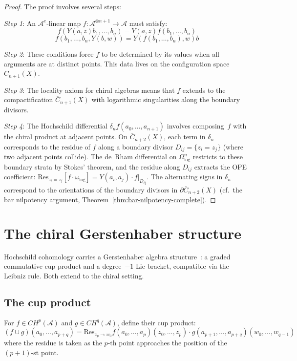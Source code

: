 \begin{proof}
The proof involves several steps:

\emph{Step 1}: An $\mathcal{A}^e$-linear map $f: \mathcal{A}^{\otimes n+1} \to \mathcal{A}$ must satisfy:
\[
f(Y(a, z)b_1, \ldots, b_n) = Y(a, z)f(b_1, \ldots, b_n)
\]
\[
f(b_1, \ldots, b_n, Y(b, w)) = Y(f(b_1, \ldots, b_n), w)b
\]

\emph{Step 2}: These conditions force $f$ to be determined by its values when all arguments are at distinct points. This data lives on the configuration space $C_{n+1}(X)$.

\emph{Step 3}: The locality axiom for chiral algebras means that $f$ extends to the compactification $\overline{C}_{n+1}(X)$ with logarithmic singularities along the boundary divisors.

\emph{Step 4}: The Hochschild differential
$\delta_n f(a_0, \ldots, a_{n+1})$ involves composing~$f$ with the
chiral product at adjacent points.  On $\overline{C}_{n+2}(X)$, each
term in $\delta_n$ corresponds to the residue of $f$ along a boundary
divisor $D_{ij} = \{z_i = z_j\}$ (where two adjacent points collide).
The de~Rham differential on $\Omega^n_{\log}$ restricts to these
boundary strata by Stokes' theorem, and the residue along
$D_{ij}$ extracts the OPE coefficient: $\mathrm{Res}_{z_i = z_j}
[f \cdot \omega_{\log}] = Y(a_i, a_j) \cdot f|_{D_{ij}}$.
The alternating signs in $\delta_n$ correspond to the orientations
of the boundary divisors in $\partial\overline{C}_{n+2}(X)$
(cf.\ the bar nilpotency argument,
Theorem~\ref{thm:bar-nilpotency-complete}). \qedhere
\end{proof}


\section{The chiral Gerstenhaber structure}

Hochschild cohomology carries a Gerstenhaber algebra structure~\cite{Ger63}: a graded commutative cup product and a degree~$-1$ Lie bracket, compatible via the Leibniz rule.  Both extend to the chiral setting.

\subsection{The cup product}

\begin{definition}
For $f \in CH^p(\mathcal{A})$ and $g \in CH^q(\mathcal{A})$, define their cup product:
\[
(f \cup g)(a_0, \ldots, a_{p+q}) = \text{Res}_{z_p \to w_0} f(a_0, \ldots, a_p)(z_0, \ldots, z_p) \cdot g(a_{p+1}, \ldots, a_{p+q})(w_0, \ldots, w_{q-1})
\]
where the residue is taken as the $p$-th point approaches the position of the $(p+1)$-st point.
\end{definition}

